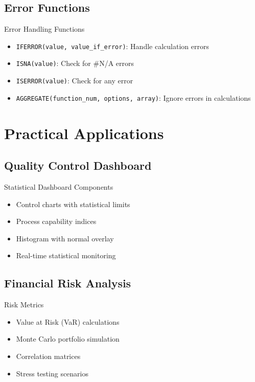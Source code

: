 \documentclass[12pt,a4paper]{book}
\begin{document}
{{\subsection{Error Functions}

\begin{example}{Error Handling Functions}
\begin{itemize}
    \item \texttt{IFERROR(value, value\_if\_error)}: Handle calculation errors
    \item \texttt{ISNA(value)}: Check for #N/A errors
    \item \texttt{ISERROR(value)}: Check for any error
    \item \texttt{AGGREGATE(function\_num, options, array)}: Ignore errors in calculations
\end{itemize}
\end{example}

\section{Practical Applications}

\subsection{Quality Control Dashboard}

\begin{example}{Statistical Dashboard Components}
\begin{itemize}
    \item Control charts with statistical limits
    \item Process capability indices
    \item Histogram with normal overlay
    \item Real-time statistical monitoring
\end{itemize}
\end{example}

\subsection{Financial Risk Analysis}

\begin{example}{Risk Metrics}
\begin{itemize}
    \item Value at Risk (VaR) calculations
    \item Monte Carlo portfolio simulation
    \item Correlation matrices
    \item Stress testing scenarios
\end{itemize}
\end{example}

}}
\end{document}
